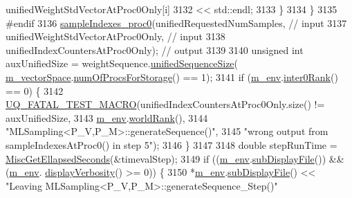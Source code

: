 \begin{DoxyCode}
      unifiedWeightStdVectorAtProc0Only[i]
3132                                   << std::endl;
3133         \}
3134       \}
3135 \textcolor{preprocessor}{#endif}
3136 \textcolor{preprocessor}{}      \hyperlink{class_q_u_e_s_o_1_1_m_l_sampling_af71979655e46135b6a3c97b8909321f0}{sampleIndexes\_proc0}(unifiedRequestedNumSamples,        \textcolor{comment}{// input}
3137                           unifiedWeightStdVectorAtProc0Only, \textcolor{comment}{// input}
3138                           unifiedIndexCountersAtProc0Only);  \textcolor{comment}{// output}
3139 
3140       \textcolor{keywordtype}{unsigned} \textcolor{keywordtype}{int} auxUnifiedSize = weightSequence.\hyperlink{class_q_u_e_s_o_1_1_scalar_sequence_a52829afc95e5c36e9db44f40854153b0}{unifiedSequenceSize}(
      \hyperlink{class_q_u_e_s_o_1_1_m_l_sampling_a7bc4c72f65ba9166ed94a6e198b0915b}{m\_vectorSpace}.\hyperlink{class_q_u_e_s_o_1_1_vector_space_a67b0c3620662116f5a346fdaa5faf38e}{numOfProcsForStorage}() == 1);
3141       \textcolor{keywordflow}{if} (\hyperlink{class_q_u_e_s_o_1_1_m_l_sampling_a13f1ca4fe9f94822fe572a743eaced1d}{m\_env}.\hyperlink{class_q_u_e_s_o_1_1_base_environment_ae106b5bb8a80b655b88b3a26b1e7c185}{inter0Rank}() == 0) \{
3142         \hyperlink{_defines_8h_a56d63d18d0a6d45757de47fcc06f574d}{UQ\_FATAL\_TEST\_MACRO}(unifiedIndexCountersAtProc0Only.size() != auxUnifiedSize,
3143                             \hyperlink{class_q_u_e_s_o_1_1_m_l_sampling_a13f1ca4fe9f94822fe572a743eaced1d}{m\_env}.\hyperlink{class_q_u_e_s_o_1_1_base_environment_a78b57112bbd0e6dd0e8afec00b40ffa7}{worldRank}(),
3144                             \textcolor{stringliteral}{"MLSampling<P\_V,P\_M>::generateSequence()"},
3145                             \textcolor{stringliteral}{"wrong output from sampleIndexesAtProc0() in step 5"});
3146       \}
3147 
3148   \textcolor{keywordtype}{double} stepRunTime = \hyperlink{namespace_q_u_e_s_o_a424bc33f2e6e287fd468408d14b772ee}{MiscGetEllapsedSeconds}(&timevalStep);
3149   \textcolor{keywordflow}{if} ((\hyperlink{class_q_u_e_s_o_1_1_m_l_sampling_a13f1ca4fe9f94822fe572a743eaced1d}{m\_env}.\hyperlink{class_q_u_e_s_o_1_1_base_environment_a8a0064746ae8dddfece4229b9ad374d6}{subDisplayFile}()) && (\hyperlink{class_q_u_e_s_o_1_1_m_l_sampling_a13f1ca4fe9f94822fe572a743eaced1d}{m\_env}.
      \hyperlink{class_q_u_e_s_o_1_1_base_environment_a1fe5f244fc0316a0ab3e37463f108b96}{displayVerbosity}() >= 0)) \{
3150     *\hyperlink{class_q_u_e_s_o_1_1_m_l_sampling_a13f1ca4fe9f94822fe572a743eaced1d}{m\_env}.\hyperlink{class_q_u_e_s_o_1_1_base_environment_a8a0064746ae8dddfece4229b9ad374d6}{subDisplayFile}() << \textcolor{stringliteral}{"Leaving MLSampling<P\_V,P\_M>::generateSequence\_Step()"}

\end{DoxyCode}
